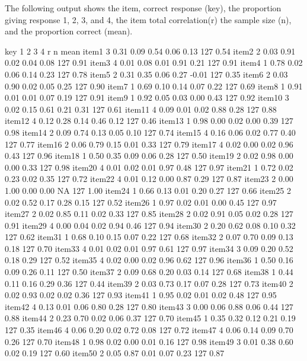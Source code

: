 \documentclass[a4paper]{article}
\begin{document}
The following output shows the item,
correct response (key), the proportion
giving response 1, 2, 3, and 4, the item total correlation(r)
the sample size (n), and the proportion correct (mean).
\begin{Schunk}
\begin{Soutput}
       key    1    2    3    4     r   n mean
item1    3 0.31 0.09 0.54 0.06  0.13 127 0.54
item2    2 0.03 0.91 0.02 0.04  0.08 127 0.91
item3    4 0.01 0.08 0.01 0.91  0.21 127 0.91
item4    1 0.78 0.02 0.06 0.14  0.23 127 0.78
item5    2 0.31 0.35 0.06 0.27 -0.01 127 0.35
item6    2 0.03 0.90 0.02 0.05  0.25 127 0.90
item7    1 0.69 0.10 0.14 0.07  0.22 127 0.69
item8    1 0.91 0.01 0.01 0.07  0.19 127 0.91
item9    1 0.92 0.05 0.03 0.00  0.43 127 0.92
item10   3 0.02 0.15 0.61 0.21  0.31 127 0.61
item11   4 0.09 0.01 0.02 0.88  0.28 127 0.88
item12   4 0.12 0.28 0.14 0.46  0.12 127 0.46
item13   1 0.98 0.00 0.02 0.00  0.39 127 0.98
item14   2 0.09 0.74 0.13 0.05  0.10 127 0.74
item15   4 0.16 0.06 0.02 0.77  0.40 127 0.77
item16   2 0.06 0.79 0.15 0.01  0.33 127 0.79
item17   4 0.02 0.00 0.02 0.96  0.43 127 0.96
item18   1 0.50 0.35 0.09 0.06  0.28 127 0.50
item19   2 0.02 0.98 0.00 0.00  0.33 127 0.98
item20   4 0.01 0.02 0.01 0.97  0.48 127 0.97
item21   1 0.72 0.02 0.23 0.02  0.35 127 0.72
item22   4 0.01 0.12 0.00 0.87  0.29 127 0.87
item23   2 0.00 1.00 0.00 0.00    NA 127 1.00
item24   1 0.66 0.13 0.01 0.20  0.27 127 0.66
item25   2 0.02 0.52 0.17 0.28  0.15 127 0.52
item26   1 0.97 0.02 0.01 0.00  0.45 127 0.97
item27   2 0.02 0.85 0.11 0.02  0.33 127 0.85
item28   2 0.02 0.91 0.05 0.02  0.28 127 0.91
item29   4 0.00 0.04 0.02 0.94  0.46 127 0.94
item30   2 0.20 0.62 0.08 0.10  0.32 127 0.62
item31   1 0.68 0.10 0.15 0.07  0.22 127 0.68
item32   2 0.07 0.70 0.09 0.13  0.18 127 0.70
item33   4 0.01 0.02 0.01 0.97  0.61 127 0.97
item34   3 0.09 0.20 0.52 0.18  0.29 127 0.52
item35   4 0.02 0.00 0.02 0.96  0.62 127 0.96
item36   1 0.50 0.16 0.09 0.26  0.11 127 0.50
item37   2 0.09 0.68 0.20 0.03  0.14 127 0.68
item38   1 0.44 0.11 0.16 0.29  0.36 127 0.44
item39   2 0.03 0.73 0.17 0.07  0.28 127 0.73
item40   2 0.02 0.93 0.02 0.02  0.36 127 0.93
item41   1 0.95 0.02 0.01 0.02  0.48 127 0.95
item42   4 0.13 0.01 0.06 0.80  0.28 127 0.80
item43   3 0.00 0.06 0.88 0.06  0.44 127 0.88
item44   2 0.23 0.70 0.02 0.06  0.37 127 0.70
item45   1 0.35 0.32 0.12 0.21  0.19 127 0.35
item46   4 0.06 0.20 0.02 0.72  0.08 127 0.72
item47   4 0.06 0.14 0.09 0.70  0.26 127 0.70
item48   1 0.98 0.02 0.00 0.01  0.16 127 0.98
item49   3 0.01 0.38 0.60 0.02  0.19 127 0.60
item50   2 0.05 0.87 0.01 0.07  0.23 127 0.87
\end{Soutput}
\end{Schunk}
\end{document}
